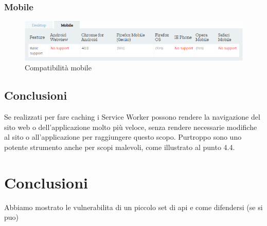 \documentclass[11pt ,a4paper , twoside , openright ]{article}
\begin{document}
\subsubsection{Mobile}
\begin{figure}[h]
	\centering
	\includegraphics[width=1\linewidth]{CompMobile}
	\caption{Compatibilità mobile}
	\label{fig:Compatibilità mobile}
\end{figure}
\subsection{Conclusioni}
Se realizzati per fare caching i Service Worker possono rendere la navigazione del sito web o dell'applicazione molto più veloce, senza rendere necessarie modifiche al sito o all'applicazione per raggiungere questo scopo. 
Purtroppo sono uno potente strumento anche per scopi malevoli, come illustrato al punto 4.4.
\newpage
\cleardoublepage
\section{Conclusioni}
Abbiamo mostrato le vulnerabilita di un piccolo set di api e come difendersi (se si puo)
\cleardoublepage
\listoffigures
\cleardoublepage
\end{document}
